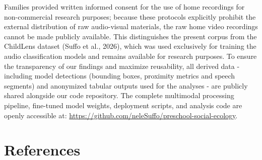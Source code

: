 \documentclass[
  english,
  12pt,
  man,floatsintext]{apa6}
\begin{document}
Families provided written informed consent for the use of home recordings for non-commercial research purposes; because these protocols explicitly prohibit the external distribution of raw audio-visual materials, the raw home video recordings cannot be made publicly available. This distinguishes the present corpus from the ChildLens dataset (Suffo et al., 2026), which was used exclusively for training the audio classification models and remains available for research purposes. To ensure the transparency of our findings and maximize reusability, all derived data - including model detections (bounding boxes, proximity metrics and speech segments) and anonymized tabular outputs used for the analyses - are publicly shared alongside our code repository. The complete multimodal processing pipeline, fine-tuned model weights, deployment scripts, and analysis code are openly accessible at: \url{https://github.com/neleSuffo/preschool-social-ecology}.

\newpage

\section{References}\label{references}

\begingroup
\setlength{\parindent}{-0.5in}
\setlength{\leftskip}{0.5in}
\end{document}
